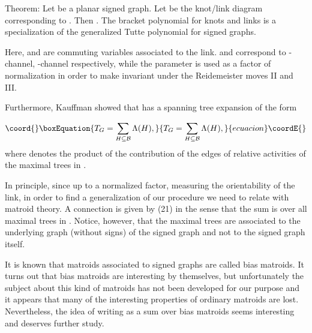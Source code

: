 \documentclass[a4paper,12pt]{article}
\begin{document}
Theorem: Let \coordHE{} be a planar signed graph. Let \coordHE{} be the knot/link
diagram corresponding to \coordHE{}. Then \coordHE{}.
The bracket polynomial for knots and links is a specialization of the
generalized Tutte polynomial for signed graphs.

Here, \coordHE{}and \coordHE{} are commuting variables associated to the link. \coordHE{} and \coordHE{} correspond to \coordHE{}-channel, \coordHE{}-channel respectively, while the parameter \coordHE{} is used as a factor of normalization in order to make \coordHE{}
invariant under the Reidemeister moves II and III.

Furthermore, Kauffman showed that \coordHE{} has a spanning tree
expansion of the form

\begin{equation}\coord{}\boxEquation{
T_{G}=\sum_{H\subseteq \mathcal{B}}\Lambda (H),  \label{21}
}{
T_{G}=\sum_{H\subseteq \mathcal{B}}\Lambda (H),  }{ecuacion}\coordE{}\end{equation}
where \coordHE{} denotes the product of the contribution of the edges of \coordHE{} relative activities of the maximal trees \coordHE{} in \coordHE{}.

In principle, since up to a normalized factor, measuring the orientability
of the link, \coordHE{} in order to find a
generalization of our procedure we need to relate \coordHE{} with matroid
theory. A \coordHE{} connection is given by (21) in
the sense that the sum is over all maximal trees \coordHE{} in \coordHE{}. Notice,
however, that the maximal trees \coordHE{} are associated to the underlying graph
(without signs) of the signed graph and not to the signed graph itself.

It is known that matroids associated to signed graphs are called bias
matroids.\coordHE{} It turns out that bias matroids are interesting by
themselves, but unfortunately the subject about this kind of matroids has
not been developed for our purpose and it appears that many of the
interesting properties of ordinary matroids are lost. Nevertheless, the idea
of writing \coordHE{} as a sum over bias matroids seems interesting and
deserves further study.
\end{document}

